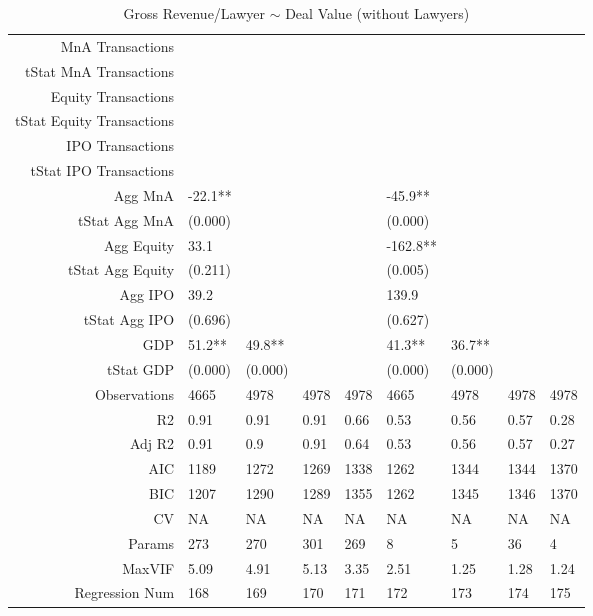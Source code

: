 \begin{table}[ht]
\begin{tabular}{rllllllll}
  MnA Transactions &  &  &  &  &  &  &  &  \\ 
  tStat MnA Transactions &  &  &  &  &  &  &  &  \\ 
  Equity Transactions &  &  &  &  &  &  &  &  \\ 
  tStat Equity Transactions &  &  &  &  &  &  &  &  \\ 
  IPO Transactions &  &  &  &  &  &  &  &  \\ 
  tStat IPO Transactions &  &  &  &  &  &  &  &  \\ 
  Agg MnA & -22.1** &  &  &  & -45.9** &  &  &  \\ 
  tStat Agg MnA & (0.000) &  &  &  & (0.000) &  &  &  \\ 
  Agg Equity & 33.1 &  &  &  & -162.8** &  &  &  \\ 
  tStat Agg Equity & (0.211) &  &  &  & (0.005) &  &  &  \\ 
  Agg IPO & 39.2 &  &  &  & 139.9 &  &  &  \\ 
  tStat Agg IPO & (0.696) &  &  &  & (0.627) &  &  &  \\ 
  GDP & 51.2** & 49.8** &  &  & 41.3** & 36.7** &  &  \\ 
  tStat GDP & (0.000) & (0.000) &  &  & (0.000) & (0.000) &  &  \\ 
  Observations & 4665 & 4978 & 4978 & 4978 & 4665 & 4978 & 4978 & 4978 \\ 
  R2 & 0.91 & 0.91 & 0.91 & 0.66 & 0.53 & 0.56 & 0.57 & 0.28 \\ 
  Adj R2 & 0.91 & 0.9 & 0.91 & 0.64 & 0.53 & 0.56 & 0.57 & 0.27 \\ 
  AIC & 1189 & 1272 & 1269 & 1338 & 1262 & 1344 & 1344 & 1370 \\ 
  BIC & 1207 & 1290 & 1289 & 1355 & 1262 & 1345 & 1346 & 1370 \\ 
  CV & NA & NA & NA & NA & NA & NA & NA & NA \\ 
  Params & 273 & 270 & 301 & 269 & 8 & 5 & 36 & 4 \\ 
  MaxVIF & 5.09 & 4.91 & 5.13 & 3.35 & 2.51 & 1.25 & 1.28 & 1.24 \\ 
  Regression Num & 168 & 169 & 170 & 171 & 172 & 173 & 174 & 175 \\ 
   \hline
\end{tabular}
\caption{Gross Revenue/Lawyer $\sim$ Deal Value (without Lawyers)} 
\end{table}
